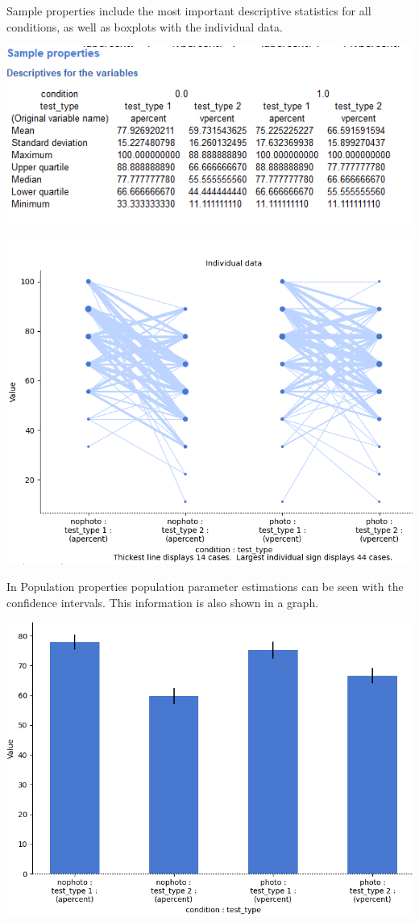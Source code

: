 \documentclass[
]{book}
\begin{document}
Sample properties include the most important descriptive statistics for all conditions, as well as boxplots with the individual data.

\includegraphics{img/ch11/11.3CRMVG_descriptives.png}

\includegraphics{img/ch11/11.3CRMVG_plot.png}

In Population properties population parameter estimations can be seen with the confidence intervals. This information is also shown in a graph.

\includegraphics{img/ch11/11.3CRMVG_CI_plot.png}
\end{document}
